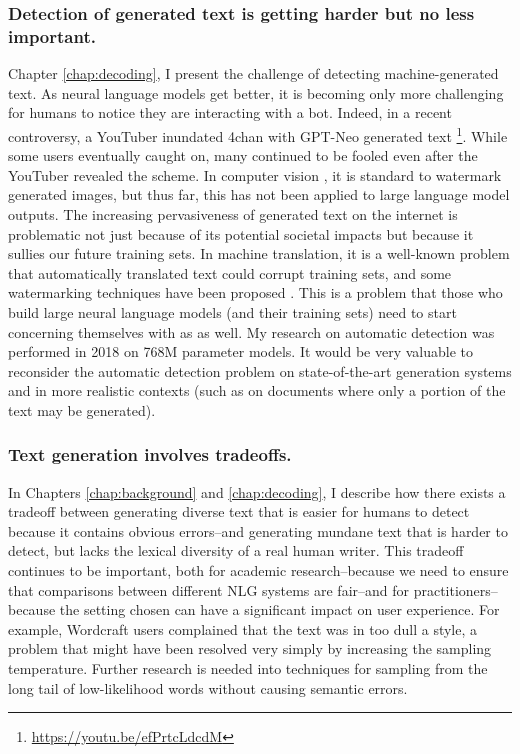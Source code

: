 \subsubsection{Detection of generated text is getting harder but no less important.}
	Chapter \ref{chap:decoding}, I present the challenge of detecting machine-generated text.
	As neural language models get better, it is becoming only more challenging for humans to notice they are interacting with a bot.
	Indeed, in a recent controversy, a YouTuber inundated 4chan with GPT-Neo generated text \footnote{\url{https://youtu.be/efPrtcLdcdM}}.
	While some users eventually caught on, many continued to be fooled even after the YouTuber revealed the scheme.
	In computer vision \citep{saharia2022photorealistic,ramesh2022hierarchical}, it is standard to watermark generated images, but thus far, this has not been applied to large language model outputs.
	The increasing pervasiveness of generated text on the internet is problematic not just because of its potential societal impacts but because it sullies our future training sets.
	In machine translation, it is a well-known problem that automatically translated text could corrupt training sets, and some watermarking techniques have been proposed \citep{venugopal2011watermarking}.
	This is a problem that those who build large neural language models (and their training sets) need to start concerning themselves with as as well.
	My research on automatic detection was performed in 2018 on 768M parameter models.
	It would be very valuable to reconsider the automatic detection problem on state-of-the-art generation systems and in more realistic contexts (such as on documents where only a portion of the text may be generated).

\subsubsection{Text generation involves tradeoffs.}
	In Chapters \ref{chap:background} and \ref{chap:decoding}, I describe how there exists a tradeoff between generating diverse text that is easier for humans to detect because it contains obvious errors--and generating mundane text that is harder to detect, but lacks the lexical diversity of a real human writer.
	This tradeoff continues to be important, both for academic research--because we need to ensure that  comparisons between different NLG systems are fair--and for practitioners--because the setting chosen can have a significant impact on user experience.
	For example, Wordcraft users complained that the text was in too dull a style, a problem that might have been resolved very simply by increasing the sampling temperature.
	Further research is needed into techniques for sampling from the long tail of low-likelihood words without causing semantic errors.

